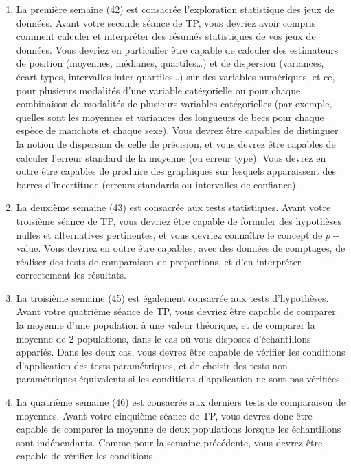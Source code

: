 \documentclass[
  a4paper,
  DIV=11,
  numbers=noendperiod,
  oneside]{scrreprt}
\begin{document}
\begin{enumerate}
\def\labelenumi{\arabic{enumi}.}
\item
  La première semaine (42) est consacrée l'exploration statistique des
  jeux de données. Avant votre seconde séance de TP, vous devriez avoir
  compris comment calculer et interpréter des résumés statistiques de
  vos jeux de données. Vous devriez en particulier être capable de
  calculer des estimateurs de position (moyennes, médianes,
  quartiles\ldots) et de dispersion (variances, écart-types, intervalles
  inter-quartiles\ldots) sur des variables numériques, et ce, pour
  plusieurs modalités d'une variable catégorielle ou pour chaque
  combinaison de modalités de plusieurs variables catégorielles (par
  exemple, quelles sont les moyennes et variances des longueurs de becs
  pour chaque espèce de manchots et chaque sexe). Vous devrez être
  capables de distinguer la notion de dispersion de celle de précision,
  et vous devrez être capables de calculer l'erreur standard de la
  moyenne (ou erreur type). Vous devrez en outre être capables de
  produire des graphiques sur lesquels apparaissent des barres
  d'incertitude (erreurs standards ou intervalles de confiance).
\item
  La deuxième semaine (43) est consacrée aux tests statistiques. Avant
  votre troisième séance de TP, vous devriez être capable de formuler
  des hypothèses nulles et alternatives pertinentes, et vous devriez
  connaître le concept de \(p-\)value. Vous devriez en outre être
  capables, avec des données de comptages, de réaliser des tests de
  comparaison de proportions, et d'en interpréter correctement les
  résultats.
\item
  La troisième semaine (45) est également consacrée aux tests
  d'hypothèses. Avant votre quatrième séance de TP, vous devriez être
  capable de comparer la moyenne d'une population à une valeur
  théorique, et de comparer la moyenne de 2 populations, dans le cas où
  vous disposez d'échantillons appariés. Dans les deux cas, vous devrez
  être capable de vérifier les conditions d'application des tests
  paramétriques, et de choisir des tests non-paramétriques équivalents
  si les conditions d'application ne sont pas vérifiées.
\item
  La quatrième semaine (46) est consacrée aux derniers tests de
  comparaison de moyennes. Avant votre cinquième séance de TP, vous
  devrez donc être capable de comparer la moyenne de deux populations
  lorsque les échantillons sont indépendants. Comme pour la semaine
  précédente, vous devrez être capable de vérifier les conditions

\end{enumerate}
\end{document}
